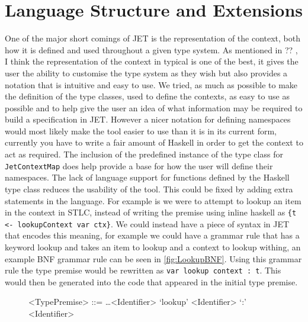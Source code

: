 \section{Language Structure and Extensions}
One of the major short comings of JET is the representation of the context, both how it is defined and used throughout a given type system.
As mentioned in ?? , I think the representation of the context in typical is one of the best, it gives the user the ability to customise the type system as they wish but also provides a notation that is intuitive and easy to use.
We tried, as much as possible to make the definition of the type classes, used to define the contexts, as easy to use as possible and to help give the user an idea of what information may be required to build a specification in JET.
However a nicer notation for defining namespaces would most likely make the tool easier to use than it is in its current form, currently you have to write a fair amount of Haskell in order to get the context to act as required.
The inclusion of the predefined instance of the type class for \texttt{JetContextMap} does help provide a base for how the user will define their namespaces.
The lack of language support for functions defined by the Haskell type class reduces the usability of the tool.
This could be fixed by adding extra statements in the language.
For example is we were to attempt to lookup an item in the context in STLC, instead of writing the premise using inline haskell as \texttt{\{t <- lookupContext var ctx\}}.
We could instead have a piece of syntax in JET that encodes this meaning, for example we could have a grammar rule that has a keyword lookup and takes an item to lookup and a context to lookup withing, an example BNF grammar rule can be seen in \autoref{fig:LookupBNF}.
Using this grammar rule the type premise would be rewritten as \texttt{var lookup context : t}.
This would then be generated into the code that appeared in the initial type premise.

\begin{figure}[]
    \centering
    \begin{grammar}
        <TypePremise> ::= \dots \alt <Identifier> `lookup' <Identifier> `:' <Identifier>
    \end{grammar}
    \caption{}
    \label{fig:LookupBNF}
\end{figure}

